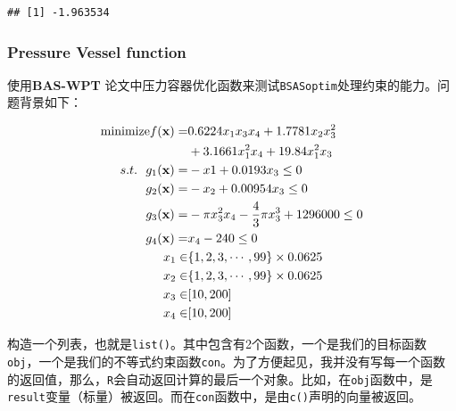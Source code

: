 \documentclass[]{ctexbook}
\begin{document}
\begin{verbatim}
## [1] -1.963534
\end{verbatim}

\subsubsection{Pressure Vessel function}\label{BSASpv}

使用\textbf{BAS-WPT}\citep{Jiangwpt}
论文中压力容器优化函数来测试\texttt{BSASoptim}处理约束的能力。问题背景如下：

\begin{align}
\text{minimize} f(\mathbf{x}) = &0.6224x_1x_3x_4+1.7781x_2x^2_3 \notag\\
&+3.1661x^2_1x_4 + 19.84x^2_1x_3 \notag \\
s.t. ~~ g_1(\mathbf{x}) = & -x1 + 0.0193x_3 \leq 0 \notag \\
g_2(\mathbf{x}) = & -x_2 + 0.00954x_3 \leq 0 \notag \\
g_3(\mathbf{x}) = & -\pi x^2_3x_4 -\frac{4}{3}\pi x^3_3 + 1296000 \leq 0 \notag \\
g_4(\mathbf{x}) = & x_4-240\leq 0 \notag \\
x_1 \in& \{1,2,3,\cdots,99\}\times0.0625 \notag \\
x_2 \in& \{1,2,3,\cdots,99\}\times0.0625 \notag \\
x_3 \in& [10,200] \notag \\
x_4 \in& [10,200] \notag \\
\label{eq:PV}
\end{align}

构造一个列表，也就是\texttt{list()}。其中包含有2个函数，一个是我们的目标函数\texttt{obj}，一个是我们的不等式约束函数\texttt{con}。为了方便起见，我并没有写每一个函数的返回值，那么，\texttt{R}会自动返回计算的最后一个对象。比如，在\texttt{obj}函数中，是\texttt{result}变量（标量）被返回。而在\texttt{con}函数中，是由\texttt{c()}声明的向量被返回。
\end{document}
